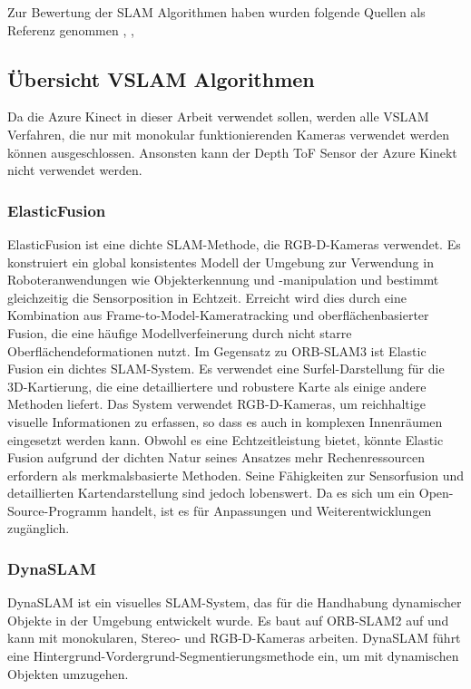 Zur Bewertung der \ac{SLAM} Algorithmen haben wurden folgende Quellen als Referenz genommen \cite{ragot:hal-04071273}, \cite{Merzlyakov2021}, \cite{9440682}

\subsection{Übersicht VSLAM Algorithmen}\label{chp:übersicht-slamalgo}

Da die Azure Kinect in dieser Arbeit verwendet sollen, werden alle \ac{VSLAM} Verfahren, die nur mit monokular funktionierenden Kameras verwendet werden können ausgeschlossen.
Ansonsten kann der Depth \ac{ToF} Sensor der Azure Kinekt nicht verwendet werden.

\subsubsection{ElasticFusion}


ElasticFusion ist eine dichte \ac{SLAM}-Methode, die \ac{RGB-D}-Kameras verwendet. Es konstruiert ein global konsistentes Modell der Umgebung zur Verwendung in Roboteranwendungen wie Objekterkennung und -manipulation und bestimmt gleichzeitig die Sensorposition in Echtzeit. Erreicht wird dies durch eine Kombination aus Frame-to-Model-Kameratracking und oberflächenbasierter Fusion, die eine häufige Modellverfeinerung durch nicht starre Oberflächendeformationen nutzt. 
Im Gegensatz zu ORB-SLAM3 ist Elastic Fusion ein dichtes \ac{SLAM}-System. Es verwendet eine Surfel-Darstellung für die 3D-Kartierung, die eine detailliertere und robustere Karte als einige andere Methoden liefert. Das System verwendet \ac{RGB-D}-Kameras, um reichhaltige visuelle Informationen zu erfassen, so dass es auch in komplexen Innenräumen eingesetzt werden kann. Obwohl es eine Echtzeitleistung bietet, könnte Elastic Fusion aufgrund der dichten Natur seines Ansatzes mehr Rechenressourcen erfordern als merkmalsbasierte Methoden. Seine Fähigkeiten zur Sensorfusion und detaillierten Kartendarstellung sind jedoch lobenswert. Da es sich um ein Open-Source-Programm handelt, ist es für Anpassungen und Weiterentwicklungen zugänglich.

\cite{elasticfusion}
\subsubsection{DynaSLAM}

DynaSLAM ist ein visuelles \ac{SLAM}-System, das für die Handhabung dynamischer Objekte in der Umgebung entwickelt wurde. Es baut auf ORB-SLAM2 auf und kann mit monokularen, Stereo- und \ac{RGB-D}-Kameras arbeiten. DynaSLAM führt eine Hintergrund-Vordergrund-Segmentierungsmethode ein, um mit dynamischen Objekten umzugehen.

